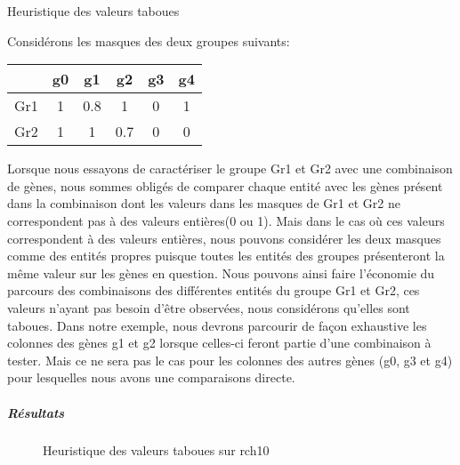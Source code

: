\begin{exemple}{Heuristique des valeurs taboues\\}
{
	Considérons les masques des deux groupes suivants:\\
	\begin{center}
		\begin{tabular}{|c|c|c|c|c|c|}
		\hline 
		\backslashbox{Groupe}{Gènes} & g0 & g1 & g2 & g3 & g4 \\ 
		\hline 
		Gr1 & 1 & 0.8 & 1 & 0 & 1 \\ 
		\hline 
		Gr2 & 1 & 1 & 0.7 & 0 & 0 \\  
		\hline 
		\end{tabular}
	\end{center}
	
Lorsque nous essayons de caractériser le groupe Gr1 et Gr2 avec une combinaison de gènes, nous sommes obligés de comparer chaque entité avec les gènes présent dans la combinaison dont les valeurs dans les masques de Gr1 et Gr2 ne correspondent pas à des valeurs entières(0 ou 1). Mais dans le cas où ces valeurs correspondent à des valeurs entières, nous pouvons considérer les deux masques comme des entités propres puisque toutes les entités des groupes présenteront la même valeur sur les gènes en question. Nous pouvons ainsi faire l'économie du parcours des combinaisons des différentes entités du groupe Gr1 et Gr2, ces valeurs n'ayant pas besoin d'être observées, nous considérons qu'elles sont taboues. Dans notre exemple, nous devrons parcourir de façon exhaustive les colonnes des gènes g1 et g2 lorsque celles-ci feront partie d'une combinaison à tester. Mais ce ne sera pas le cas pour les colonnes des autres gènes (g0, g3 et g4) pour lesquelles nous avons une comparaisons directe.
}
\end{exemple}



\subparagraph{Résultats}

\begin{figure}
\centering
	\begin{minipage}[c]{0.49\linewidth}
	\centering
	
	\end{minipage}
	\begin{minipage}[c]{0.49\linewidth}
	\centering
	
	\end{minipage}
\caption{Heuristique des valeurs taboues sur rch10}
\label{tabourch10}
\end{figure}

